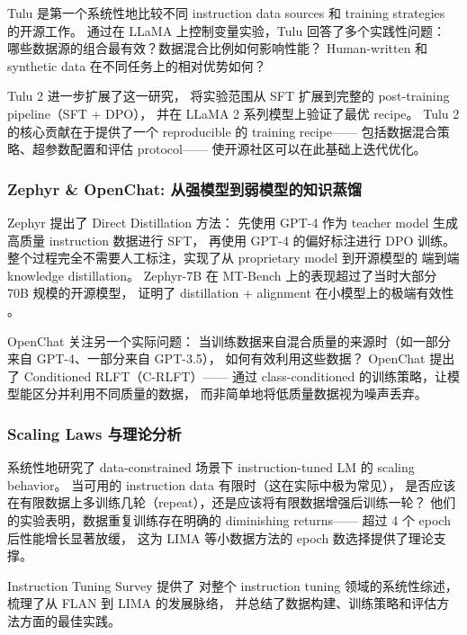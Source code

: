 Tulu \citep{wang2023tulu} 是第一个系统性地比较不同 instruction data
sources 和 training strategies 的开源工作。
通过在 LLaMA 上控制变量实验，Tulu 回答了多个实践性问题：
哪些数据源的组合最有效？数据混合比例如何影响性能？
Human-written 和 synthetic data 在不同任务上的相对优势如何？

Tulu 2 \citep{ivison2023tulu2} 进一步扩展了这一研究，
将实验范围从 SFT 扩展到完整的 post-training pipeline（SFT + DPO），
并在 LLaMA 2 系列模型上验证了最优 recipe。
Tulu 2 的核心贡献在于提供了一个 reproducible 的 training recipe——
包括数据混合策略、超参数配置和评估 protocol——
使开源社区可以在此基础上迭代优化。

\subsubsection{Zephyr \& OpenChat: 从强模型到弱模型的知识蒸馏}
\label{sec:t1-distillation}

Zephyr \citep{tunstall2023zephyr} 提出了 Direct Distillation 方法：
先使用 GPT-4 作为 teacher model 生成高质量 instruction 数据进行 SFT，
再使用 GPT-4 的偏好标注进行 DPO 训练。
整个过程完全不需要人工标注，实现了从 proprietary model 到开源模型的
端到端 knowledge distillation。
Zephyr-7B 在 MT-Bench 上的表现超过了当时大部分 70B 规模的开源模型，
证明了 distillation + alignment 在小模型上的极端有效性
。

OpenChat \citep{wang2023openchat} 关注另一个实际问题：
当训练数据来自混合质量的来源时（如一部分来自 GPT-4、一部分来自 GPT-3.5），
如何有效利用这些数据？
OpenChat 提出了 Conditioned RLFT（C-RLFT）——
通过 class-conditioned 的训练策略，让模型能区分并利用不同质量的数据，
而非简单地将低质量数据视为噪声丢弃。


\subsubsection{Scaling Laws 与理论分析}
\label{sec:t1-scaling}

\citet{muennighoff2023scaling} 系统性地研究了
data-constrained 场景下 instruction-tuned LM 的 scaling behavior。
当可用的 instruction data 有限时（这在实际中极为常见），
是否应该在有限数据上多训练几轮（repeat），还是应该将有限数据增强后训练一轮？
他们的实验表明，数据重复训练存在明确的 diminishing returns——
超过 4 个 epoch 后性能增长显著放缓，
这为 LIMA 等小数据方法的 epoch 数选择提供了理论支撑。

Instruction Tuning Survey \citep{zhang2023instruction} 提供了
对整个 instruction tuning 领域的系统性综述，梳理了从 FLAN 到 LIMA 的发展脉络，
并总结了数据构建、训练策略和评估方法方面的最佳实践。


